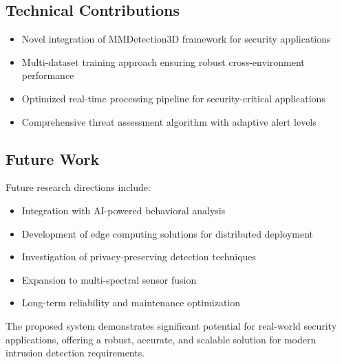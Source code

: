 \documentclass[conference]{IEEEtran}
\begin{document}
\subsection{Technical Contributions}
\begin{itemize}
\item Novel integration of MMDetection3D framework for security applications
\item Multi-dataset training approach ensuring robust cross-environment performance
\item Optimized real-time processing pipeline for security-critical applications
\item Comprehensive threat assessment algorithm with adaptive alert levels
\end{itemize}

\subsection{Future Work}
Future research directions include:
\begin{itemize}
\item Integration with AI-powered behavioral analysis
\item Development of edge computing solutions for distributed deployment
\item Investigation of privacy-preserving detection techniques
\item Expansion to multi-spectral sensor fusion
\item Long-term reliability and maintenance optimization
\end{itemize}

The proposed system demonstrates significant potential for real-world security applications, offering a robust, accurate, and scalable solution for modern intrusion detection requirements.
\end{document}
